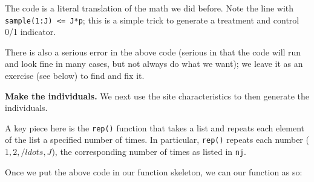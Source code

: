 \documentclass[
]{book}
\newenvironment{Shaded}{\begin{snugshade}}{\end{snugshade}}
\newcommand{\AttributeTok}[1]{\textcolor[rgb]{0.13,0.29,0.53}{#1}}
\newcommand{\CommentTok}[1]{\textcolor[rgb]{0.56,0.35,0.01}{\textit{#1}}}
\newcommand{\DecValTok}[1]{\textcolor[rgb]{0.00,0.00,0.81}{#1}}
\newcommand{\FunctionTok}[1]{\textcolor[rgb]{0.13,0.29,0.53}{\textbf{#1}}}
\newcommand{\NormalTok}[1]{#1}
\newcommand{\OtherTok}[1]{\textcolor[rgb]{0.56,0.35,0.01}{#1}}
\newcommand{\SpecialCharTok}[1]{\textcolor[rgb]{0.81,0.36,0.00}{\textbf{#1}}}
\begin{document}
The code is a literal translation of the math we did before.
Note the line with \texttt{sample(1:J)\ \textless{}=\ J*p}; this is a simple trick to generate a treatment and control 0/1 indicator.

There is also a serious error in the above code (serious in that the code will run and look fine in many cases, but not always do what we want); we leave it as an exercise (see below) to find and fix it.

\textbf{Make the individuals.}
We next use the site characteristics to then generate the individuals.

\begin{Shaded}
\end{Shaded}

A key piece here is the \texttt{rep()} function that takes a list and repeats each element of the list a specified number of times.
In particular, \texttt{rep()} repeats each number (\(1, 2, /ldots,J\)), the corresponding number of times as listed in \texttt{nj}.

Once we put the above code in our function skeleton, we can our function as so:
\end{document}
